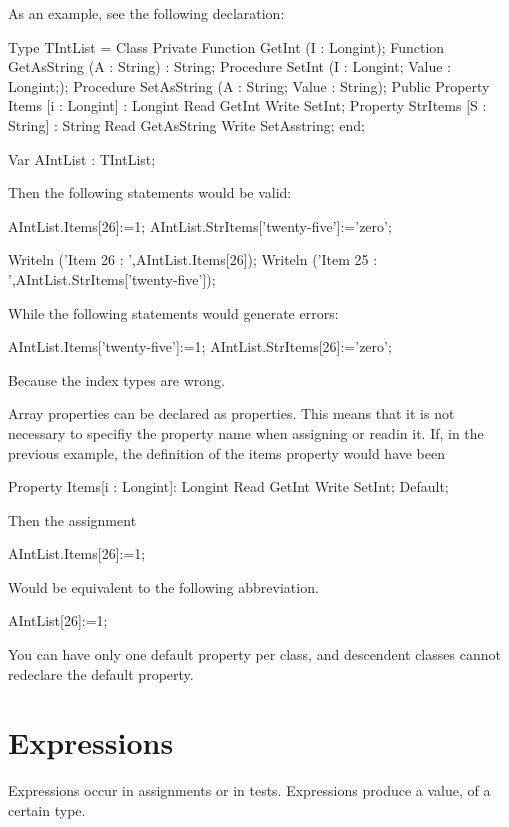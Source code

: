 \documentclass{report}
\begin{document}
As an example, see the following declaration:
\begin{listing}
Type TIntList = Class
      Private
      Function GetInt (I : Longint);
      Function GetAsString (A : String) : String;
      Procedure SetInt (I : Longint; Value : Longint;);
      Procedure SetAsString (A : String; Value : String);
      Public
      Property Items [i : Longint] : Longint Read GetInt 
                                             Write SetInt;
      Property StrItems [S : String] : String Read GetAsString 
                                              Write SetAsstring;
      end;

Var AIntList : TIntList;
\end{listing}
Then the following statements would be valid:
\begin{listing}
AIntList.Items[26]:=1;
AIntList.StrItems['twenty-five']:='zero';

Writeln ('Item 26 : ',AIntList.Items[26]);
Writeln ('Item 25 : ',AIntList.StrItems['twenty-five']);
\end{listing}
While the following statements would generate errors:
\begin{listing}
AIntList.Items['twenty-five']:=1;
AIntList.StrItems[26]:='zero';
\end{listing}
Because the index types are wrong.

Array properties can be declared as  properties. This means that
it is not necessary to specifiy the property name when assigning or readin
it. If, in the previous example, the definition of the items property would 
have been
\begin{listing}
 Property Items[i : Longint]: Longint Read GetInt 
                                      Write SetInt; Default;
\end{listing}
Then the assignment
\begin{listing}
AIntList.Items[26]:=1;
\end{listing}
Would be equivalent to the following abbreviation.
\begin{listing}
AIntList[26]:=1;
\end{listing}
You can have only one default property per class, and descendent classes
cannot redeclare the default property.

\chapter{Expressions}

Expressions occur in assignments or in tests. Expressions produce a value,
of a certain type. 
\end{document}
